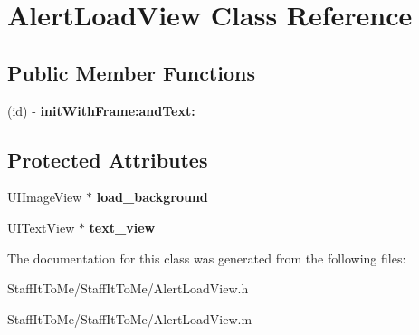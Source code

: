\hypertarget{interface_alert_load_view}{
\section{\-Alert\-Load\-View \-Class \-Reference}
\label{interface_alert_load_view}
}
\subsection*{\-Public \-Member \-Functions}
\begin{DoxyCompactItemize}
\item 
\hypertarget{interface_alert_load_view_ae32ddc1a5d78e4a7e3e7be8276bd425d}{
(id) -\/ {\bfseries init\-With\-Frame\-:and\-Text\-:}}
\label{interface_alert_load_view_ae32ddc1a5d78e4a7e3e7be8276bd425d}

\end{DoxyCompactItemize}
\subsection*{\-Protected \-Attributes}
\begin{DoxyCompactItemize}
\item 
\hypertarget{interface_alert_load_view_afedad0118fc61b471c955094f8c75ffc}{
\-U\-I\-Image\-View $\ast$ {\bfseries load\-\_\-background}}
\label{interface_alert_load_view_afedad0118fc61b471c955094f8c75ffc}

\item 
\hypertarget{interface_alert_load_view_ab4f31dfbbc9d28003942c497ab661e26}{
\-U\-I\-Text\-View $\ast$ {\bfseries text\-\_\-view}}
\label{interface_alert_load_view_ab4f31dfbbc9d28003942c497ab661e26}

\end{DoxyCompactItemize}


\-The documentation for this class was generated from the following files\-:\begin{DoxyCompactItemize}
\item 
\-Staff\-It\-To\-Me/\-Staff\-It\-To\-Me/\-Alert\-Load\-View.\-h\item 
\-Staff\-It\-To\-Me/\-Staff\-It\-To\-Me/\-Alert\-Load\-View.\-m\end{DoxyCompactItemize}
